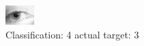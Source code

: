 \begin{figure}[h!]
\begin{center}
\includegraphics[width=0.60\columnwidth]{figures/ID1394_class_4_target_3.png}
\end{center}
\caption{ Classification: 4 actual target: 3}
\label{fig:ID1394_class_4_target_3}
\end{figure}
